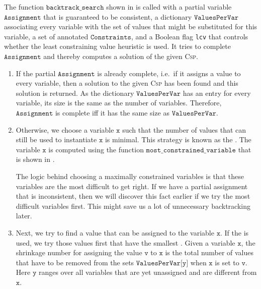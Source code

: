 The function $\texttt{backtrack\_search}$ shown in  is called with a
partial variable $\texttt{Assignment}$ that is guaranteed to be consistent, a dictionary
$\texttt{ValuesPerVar}$ associating every variable with the set of values that might be substituted for this variable, a
set of annotated $\texttt{Constraints}$, and a Boolean flag \texttt{lcv} that controls whether the
least constraining value heuristic is used.  It tries to complete $\texttt{Assignment}$ and thereby computes a
solution of the given \textsc{Csp}.  
\begin{enumerate}
\item If the partial $\texttt{Assignment}$ is already complete, i.e.~if it assigns a value to every variable, 
      then a solution to the given \textsc{Csp} has been found and this solution is returned.  As the
      dictionary $\texttt{ValuesPerVar}$ has an entry for every variable, its size is the same as the number of
      variables. Therefore, $\texttt{Assignment}$ is complete iff it has the same size as $\texttt{ValuesPerVar}$.
\item Otherwise, we choose a variable $\texttt{x}$ such that the number of values that can still be used to
      instantiate $\texttt{x}$ is minimal.  This strategy is known as the . 
      The variable $\texttt{x}$ is computed using the function
      $\texttt{most\_constrained\_variable}$ that is shown in .
      
      The logic behind choosing a maximally constrained variables is that these variables are the most
      difficult to get right.  If we have a partial assignment that is inconsistent, then we will discover this
      fact earlier if we try the most difficult variables first.  This might save us a lot of unnecessary
      backtracking later. 
\item Next, we try to find a value that can be assigned to the variable $\texttt{x}$.
      If the  is used, we try those values first that have the
      smallest .  Given a variable $\texttt{x}$, the shrinkage number for assigning the
      value $\texttt{v}$ to $\texttt{x}$ is the total number of values 
      that have to be removed from the sets $\texttt{ValuesPerVar[y]}$ when $\texttt{x}$ is set to $\texttt{v}$.
      Here $\texttt{y}$ ranges over all variables that are yet unassigned and are different from $\texttt{x}$.


\end{enumerate}

